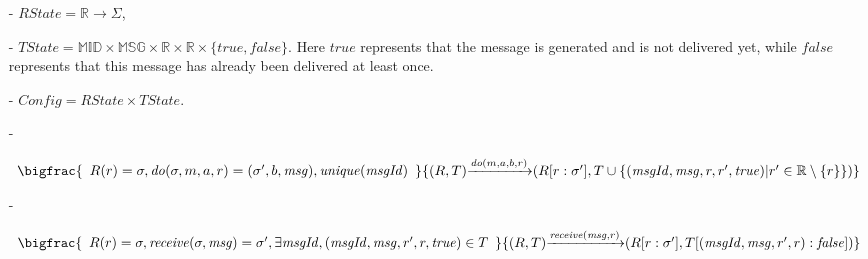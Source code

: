 \begin{itemize}
\setlength{\itemsep}{0.5pt}
\item[-] $\mathit{RState} = \mathbb{R} \rightarrow \Sigma$,

\item[-] $\mathit{TState} = \mathbb{MID} \times \mathbb{MSG} \times \mathbb{R} \times \mathbb{R} \times \{ \mathit{true},\mathit{false} \}$. Here $\mathit{true}$ represents that the message is generated and is not delivered yet, while $\mathit{false}$ represents that this message has already been delivered at least once.


\item[-] $\mathit{Config} = \mathit{RState} \times \mathit{TState}$.

\item[-]

$\begin{array}{l c}
   \bigfrac{
   \begin{array}{c}
     R(r) = \sigma, \mathit{do}(\sigma,m,a,r) = (\sigma',b,\mathit{msg}), \mathit{unique}(\mathit{msgId})
   \end{array}}
     {(R,T) {\xrightarrow{\mathit{do}(m,a,b,r)}} (R[r:\sigma'],T \cup \{ (\mathit{msgId},\mathit{msg},r,r',\mathit{true}) \vert r' \in \mathbb{R} \setminus \{ r \} \})}
\end{array}$

\item[-]

$\begin{array}{l c}
   \bigfrac{
   \begin{array}{c}
      R(r) = \sigma, \mathit{receive}(\sigma,\mathit{msg}) = \sigma', \exists \mathit{msgId},(\mathit{msgId},\mathit{msg},r',r,\mathit{true}) \in T
   \end{array}}
     {(R,T) {\xrightarrow{\mathit{receive}(\mathit{msg},r)}} (R[r:\sigma'],T[(\mathit{msgId},\mathit{msg},r',r):\mathit{false}])}
\end{array}$
\end{itemize}



